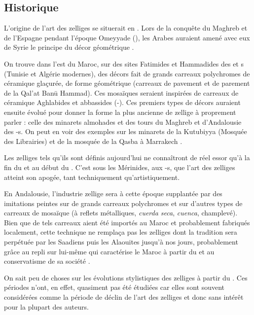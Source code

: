 \subsection{Historique}
L'origine de l'art des zelliges se situerait en . 
Lors de la conquête du Maghreb et de l'Espagne pendant l'époque 
Omeyyade (), les Arabes auraient amené avec eux de 
Syrie le principe du décor géométrique \autocite{Damluji_1993a}.

On trouve dans l'est du Maroc, sur des sites Fatimides et Hammadides 
des  et s (Tunisie et Algérie modernes), des 
décors fait de grands carreaux polychromes de céramique glaçurée, de 
forme géométrique (carreaux de pavement et de parement de la Qal'at 
Ban\=u Hammad). Ces mosaïques seraient inspirées de carreaux de 
céramique Aghlabides et abbassides (-). Ces 
premiers types de décors auraient ensuite évolué pour donner la 
forme la plus ancienne de zellige à proprement parler : celle des 
minarets almohades et des tours du Maghreb et d'Andalousie des
-s. On peut en voir des exemples 
 sur les minarets de la 
Kutubiyya (Mosquée des Librairies) et de la mosquée de la Qasba à 
Marrakech \autocite{Damluji_1993a}.

Les zelliges tels qu'ils sont définis aujourd'hui  ne connaîtront de réel essor qu'à la fin du 
 et au début du . C'est sous les Mérinides, 
aux -s, que l'art des zelliges atteint son 
apogée, tant techniquement qu'artistiquement.

En Andalousie, l'industrie zellige sera à cette époque supplantée 
par des imitations peintes sur de grands carreaux polychromes et 
sur d'autres types de carreaux de mosaïque (à reflets métalliques, 
\emph{cuerda seca}, \emph{cuenca}, champlevé). Bien que de tels 
carreaux aient été importés au Maroc et probablement fabriqués 
localement, cette technique ne remplaça pas les zelliges dont la 
tradition sera perpétuée par les Saadiens puis les Alaouites jusqu'à 
nos jours, probablement grâce au repli sur lui-même qui caractérise 
le Maroc à partir du  et au conservatisme de sa société 
\autocite{Damluji_1993a}.

On sait peu de choses sur les évolutions stylistiques des zelliges 
à partir du . Ces périodes n'ont, en effet, quasiment
pas été étudiées car elles sont souvent considérées comme la période 
de déclin de l'art des zelliges et donc sans intérêt pour la plupart 
des auteurs.

